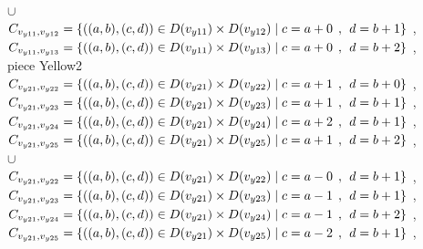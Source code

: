 \\$\cup$
\\$C_{v_{y11},v_{y12}}=\{((a,b),(c,d))\in D(v_{y11})\times D(v_{y12})\mid c = a + 0\hspace{1ex} , \hspace{1ex}  d = b + 1 \}$ , 
\\$C_{v_{y11},v_{y13}}=\{((a,b),(c,d))\in D(v_{y11})\times D(v_{y13})\mid c = a + 0\hspace{1ex} , \hspace{1ex}  d = b + 2 \}$ , 
\\ piece Yellow2
\\$C_{v_{y21},v_{y22}}=\{((a,b),(c,d))\in D(v_{y21}) \times D(v_{y22}) \mid c = a + 1\hspace{1ex} , \hspace{1ex}  d = b + 0 \}$ , 
\\$C_{v_{y21},v_{y23}}=\{((a,b),(c,d))\in D(v_{y21}) \times D(v_{y23})\mid c = a + 1\hspace{1ex} , \hspace{1ex}  d = b + 1 \}$ , 
\\$C_{v_{y21},v_{y24}}=\{((a,b),(c,d))\in D(v_{y21}) \times D(v_{y24})\mid c = a + 2\hspace{1ex} , \hspace{1ex}  d = b + 1 \}$ , 
\\$C_{v_{y21},v_{y25}}=\{((a,b),(c,d))\in D(v_{y21}) \times D(v_{y25})\mid c = a + 1\hspace{1ex} , \hspace{1ex}  d = b + 2 \}$ , 
\\$\cup$
\\$C_{v_{y21},v_{y22}}=\{((a,b),(c,d))\in D(v_{y21}) \times D(v_{y22})\mid c = a - 0\hspace{1ex} , \hspace{1ex}  d = b + 1 \}$ , 
\\$C_{v_{y21},v_{y23}}=\{((a,b),(c,d))\in D(v_{y21}) \times D(v_{y23})\mid c = a - 1\hspace{1ex} , \hspace{1ex}  d = b + 1 \}$ , 
\\$C_{v_{y21},v_{y24}}=\{((a,b),(c,d))\in D(v_{y21}) \times D(v_{y24})\mid c = a - 1\hspace{1ex} , \hspace{1ex}  d = b + 2 \}$ , 
\\$C_{v_{y21},v_{y25}}=\{((a,b),(c,d))\in D(v_{y21}) \times D(v_{y25})\mid c = a - 2\hspace{1ex} , \hspace{1ex}  d = b + 1 \}$ , 
